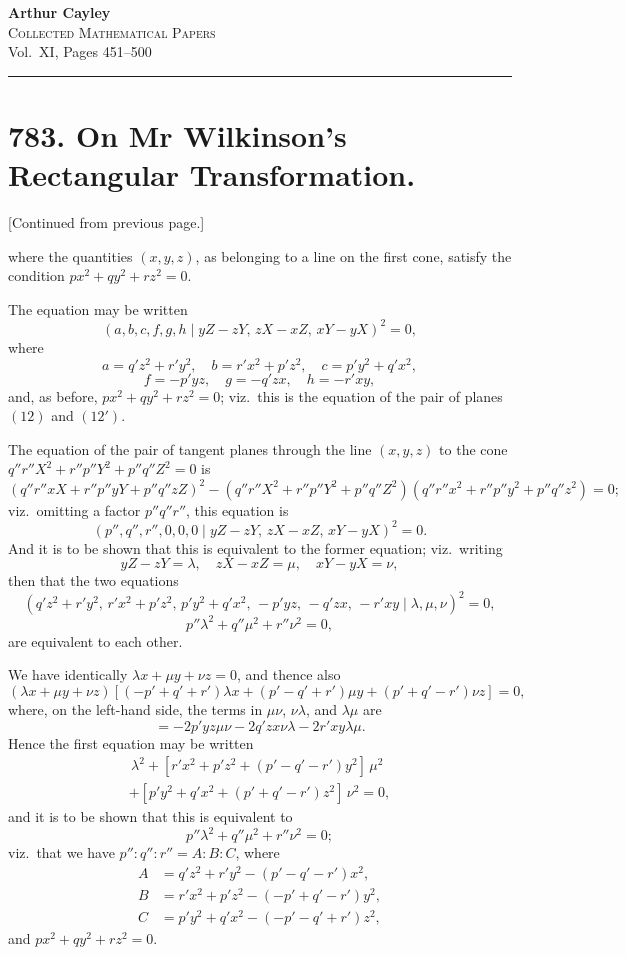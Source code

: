 \documentclass[11pt,a4paper]{article}
\begin{document}
\begin{center}
{\Large\bfseries Arthur Cayley}\\[6pt]
{\large\scshape Collected Mathematical Papers}\\[4pt]
{\normalsize Vol.~XI, Pages 451--500}
\end{center}

\hrule
\vspace{12pt}

\section*{783. On Mr Wilkinson's Rectangular Transformation.}

[Continued from previous page.]

where the quantities $(x, y, z)$, as belonging to a line on the first cone,
satisfy the condition $px^2 + qy^2 + rz^2 = 0$.

The equation may be written
\[
(a, b, c, f, g, h \mid yZ-zY,\, zX-xZ,\, xY-yX)^2 = 0,
\]
where
\[
a = q'z^2 + r'y^2,\quad
b = r'x^2 + p'z^2,\quad
c = p'y^2 + q'x^2,
\]
\[
f = -p'yz,\quad g = -q'zx,\quad h = -r'xy,
\]
and, as before, $px^2 + qy^2 + rz^2 = 0$; viz.\ this is the equation of the pair
of planes $(12)$ and $(12')$.

The equation of the pair of tangent planes through the line $(x, y, z)$ to the
cone $q''r''X^2 + r''p''Y^2 + p''q''Z^2 = 0$ is
\[
(q''r''xX + r''p''yY + p''q''zZ)^2
- (q''r''X^2 + r''p''Y^2 + p''q''Z^2)(q''r''x^2 + r''p''y^2 + p''q''z^2) = 0;
\]
viz.\ omitting a factor $p''q''r''$, this equation is
\[
(p'', q'', r'', 0, 0, 0 \mid yZ-zY,\, zX-xZ,\, xY-yX)^2 = 0.
\]
And it is to be shown that this is equivalent to the former equation;
viz.\ writing
\[
yZ - zY = \lambda,\quad zX - xZ = \mu,\quad xY - yX = \nu,
\]
then that the two equations
\[
(q'z^2 + r'y^2,\, r'x^2 + p'z^2,\, p'y^2 + q'x^2,\, -p'yz,\, -q'zx,\, -r'xy \mid \lambda, \mu, \nu)^2 = 0,
\]
\[
p''\lambda^2 + q''\mu^2 + r''\nu^2 = 0,
\]
are equivalent to each other.

We have identically $\lambda x + \mu y + \nu z = 0$, and thence also
\[
(\lambda x + \mu y + \nu z)[(-p'+q'+r')\lambda x + (p'-q'+r')\mu y + (p'+q'-r')\nu z] = 0,
\]
where, on the left-hand side, the terms in $\mu\nu$, $\nu\lambda$, and $\lambda\mu$ are
\[
= -2p'yz\mu\nu - 2q'zx\nu\lambda - 2r'xy\lambda\mu.
\]
Hence the first equation may be written
\begin{multline*}
[q'z^2 + r'y^2 + (-p'+q'-r')x^2]\,\lambda^2
+ [r'x^2 + p'z^2 + (p'-q'-r')y^2]\,\mu^2 \\
+ [p'y^2 + q'x^2 + (p'+q'-r')z^2]\,\nu^2 = 0,
\end{multline*}
and it is to be shown that this is equivalent to
\[
p''\lambda^2 + q''\mu^2 + r''\nu^2 = 0;
\]
viz.\ that we have $p'':q'':r'' = A:B:C$, where
\begin{align*}
A &= q'z^2 + r'y^2 - (p'-q'-r')x^2,\\
B &= r'x^2 + p'z^2 - (-p'+q'-r')y^2,\\
C &= p'y^2 + q'x^2 - (-p'-q'+r')z^2,
\end{align*}
and $px^2 + qy^2 + rz^2 = 0$.
\end{document}
